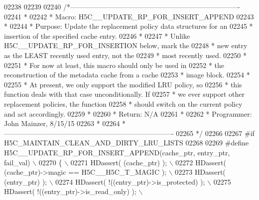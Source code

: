 \begin{DoxyCode}
02238 
02239 
02240 \textcolor{comment}{/*-------------------------------------------------------------------------}
02241 \textcolor{comment}{ *}
02242 \textcolor{comment}{ * Macro:   H5C\_\_UPDATE\_RP\_FOR\_INSERT\_APPEND}
02243 \textcolor{comment}{ *}
02244 \textcolor{comment}{ * Purpose:     Update the replacement policy data structures for an}
02245 \textcolor{comment}{ *      insertion of the specified cache entry.  }
02246 \textcolor{comment}{ *}
02247 \textcolor{comment}{ *      Unlike H5C\_\_UPDATE\_RP\_FOR\_INSERTION below, mark the }
02248 \textcolor{comment}{ *      new entry as the LEAST recently used entry, not the }
02249 \textcolor{comment}{ *      most recently used.  }
02250 \textcolor{comment}{ *}
02251 \textcolor{comment}{ *      For now at least, this macro should only be used in }
02252 \textcolor{comment}{ *      the reconstruction of the metadata cache from a cache }
02253 \textcolor{comment}{ *      image block.}
02254 \textcolor{comment}{ *}
02255 \textcolor{comment}{ *      At present, we only support the modified LRU policy, so}
02256 \textcolor{comment}{ *      this function deals with that case unconditionally.  If}
02257 \textcolor{comment}{ *      we ever support other replacement policies, the function}
02258 \textcolor{comment}{ *      should switch on the current policy and act accordingly.}
02259 \textcolor{comment}{ *}
02260 \textcolor{comment}{ * Return:      N/A}
02261 \textcolor{comment}{ *}
02262 \textcolor{comment}{ * Programmer:  John Mainzer, 8/15/15}
02263 \textcolor{comment}{ *}
02264 \textcolor{comment}{ *-------------------------------------------------------------------------}
02265 \textcolor{comment}{ */}
02266 
02267 \textcolor{preprocessor}{#if H5C\_MAINTAIN\_CLEAN\_AND\_DIRTY\_LRU\_LISTS}
02268 
02269 \textcolor{preprocessor}{#define H5C\_\_UPDATE\_RP\_FOR\_INSERT\_APPEND(cache\_ptr, entry\_ptr, fail\_val)   \(\backslash\)}
02270 \textcolor{preprocessor}{\{                                                                          \(\backslash\)}
02271 \textcolor{preprocessor}{    HDassert( (cache\_ptr) );                                               \(\backslash\)}
02272 \textcolor{preprocessor}{    HDassert( (cache\_ptr)->magic == H5C\_\_H5C\_T\_MAGIC );                    \(\backslash\)}
02273 \textcolor{preprocessor}{    HDassert( (entry\_ptr) );                                               \(\backslash\)}
02274 \textcolor{preprocessor}{    HDassert( !((entry\_ptr)->is\_protected) );                              \(\backslash\)}
02275 \textcolor{preprocessor}{    HDassert( !((entry\_ptr)->is\_read\_only) );                              \(\backslash\)}

\end{DoxyCode}
